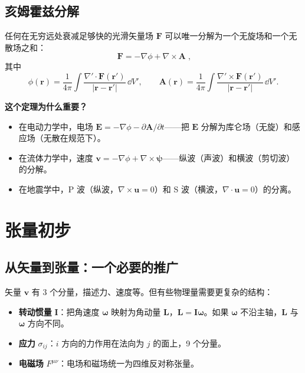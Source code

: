 \subsection{亥姆霍兹分解}

\begin{theorem}[亥姆霍兹定理]
任何在无穷远处衰减足够快的光滑矢量场 $\mathbf{F}$ 可以唯一分解为一个无旋场和一个无散场之和：
\[
\boxed{\;\mathbf{F} = -\nabla\phi + \nabla\times\mathbf{A}\;},
\label{eq:helmholtz}
\]
其中
\[
\phi(\mathbf{r}) = \frac{1}{4\pi}\int\frac{\nabla'\cdot\mathbf{F}(\mathbf{r}')}{|\mathbf{r}-\mathbf{r}'|}\,\dd V',\qquad
\mathbf{A}(\mathbf{r}) = \frac{1}{4\pi}\int\frac{\nabla'\times\mathbf{F}(\mathbf{r}')}{|\mathbf{r}-\mathbf{r}'|}\,\dd V'.
\]

{\bfseries 这个定理为什么重要？}
\begin{itemize}
\item 在电动力学中，电场 $\mathbf{E} = -\nabla\phi - \partial\mathbf{A}/\partial t$——把 $\mathbf{E}$ 分解为库仑场（无旋）和感应场（无散在规范下）。
\item 在流体力学中，速度 $\mathbf{v} = -\nabla\phi + \nabla\times\bm{\psi}$——纵波（声波）和横波（剪切波）的分解。
\item 在地震学中，P 波（纵波，$\nabla\times\mathbf{u}=0$）和 S 波（横波，$\nabla\cdot\mathbf{u}=0$）的分离。
\end{itemize}
\end{theorem}

\section{张量初步}

\subsection{从矢量到张量：一个必要的推广}

矢量 $\mathbf{v}$ 有 3 个分量，描述力、速度等。但有些物理量需要更复杂的结构：
\begin{itemize}
  \item \textbf{转动惯量} $\mathbf{I}$：把角速度 $\bm{\omega}$ 映射为角动量 $\mathbf{L}$，$\mathbf{L} = \mathbf{I}\bm{\omega}$。如果 $\bm{\omega}$ 不沿主轴，$\mathbf{L}$ 与 $\bm{\omega}$ 方向不同。
  \item \textbf{应力} $\sigma_{ij}$：$i$ 方向的力作用在法向为 $j$ 的面上，9 个分量。
  \item \textbf{电磁场} $F^{\mu\nu}$：电场和磁场统一为四维反对称张量。
\end{itemize}

